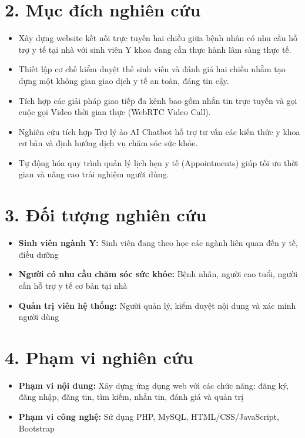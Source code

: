 \documentclass[13pt,a4paper]{extreport}
\begin{document}
\section*{2. Mục đích nghiên cứu}

\begin{itemize}
    \item Xây dựng website kết nối trực tuyến hai chiều giữa bệnh nhân có nhu cầu hỗ trợ y tế tại nhà với sinh viên Y khoa đang cần thực hành lâm sàng thực tế.
    \item Thiết lập cơ chế kiểm duyệt thẻ sinh viên và đánh giá hai chiều nhằm tạo dựng một không gian giao dịch y tế an toàn, đáng tin cậy.
    \item Tích hợp các giải pháp giao tiếp đa kênh bao gồm nhắn tin trực tuyến và gọi cuộc gọi Video thời gian thực (WebRTC Video Call).
    \item Nghiên cứu tích hợp Trợ lý ảo AI Chatbot hỗ trợ tư vấn các kiến thức y khoa cơ bản và định hướng dịch vụ chăm sóc sức khỏe.
    \item Tự động hóa quy trình quản lý lịch hẹn y tế (Appointments) giúp tối ưu thời gian và nâng cao trải nghiệm người dùng.
\end{itemize}

\section*{3. Đối tượng nghiên cứu}

\begin{itemize}
    \item \textbf{Sinh viên ngành Y:} Sinh viên đang theo học các ngành liên quan đến y tế, điều dưỡng
    \item \textbf{Người có nhu cầu chăm sóc sức khỏe:} Bệnh nhân, người cao tuổi, người cần hỗ trợ y tế cơ bản tại nhà
    \item \textbf{Quản trị viên hệ thống:} Người quản lý, kiểm duyệt nội dung và xác minh người dùng
\end{itemize}

\section*{4. Phạm vi nghiên cứu}

\begin{itemize}
    \item \textbf{Phạm vi nội dung:} Xây dựng ứng dụng web với các chức năng: đăng ký, đăng nhập, đăng tin, tìm kiếm, nhắn tin, đánh giá và quản trị
    \item \textbf{Phạm vi công nghệ:} Sử dụng PHP, MySQL, HTML/CSS/JavaScript, Bootstrap
\end{itemize}
\end{document}
